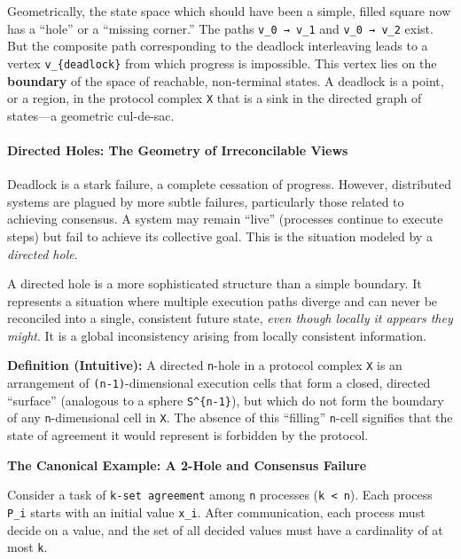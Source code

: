 \documentclass[
]{article}
\begin{document}
Geometrically, the state space which should have been a simple, filled
square now has a ``hole'' or a ``missing corner.'' The paths
\texttt{v\_0\ →\ v\_1} and \texttt{v\_0\ →\ v\_2} exist. But the
composite path corresponding to the deadlock interleaving leads to a
vertex \texttt{v\_\{deadlock\}} from which progress is impossible. This
vertex lies on the \textbf{boundary} of the space of reachable,
non-terminal states. A deadlock is a point, or a region, in the protocol
complex \texttt{X} that is a sink in the directed graph of states---a
geometric cul-de-sac.

\paragraph{Directed Holes: The Geometry of Irreconcilable
Views}\label{directed-holes-the-geometry-of-irreconcilable-views}

Deadlock is a stark failure, a complete cessation of progress. However,
distributed systems are plagued by more subtle failures, particularly
those related to achieving consensus. A system may remain ``live''
(processes continue to execute steps) but fail to achieve its collective
goal. This is the situation modeled by a \emph{directed hole}.

A directed hole is a more sophisticated structure than a simple
boundary. It represents a situation where multiple execution paths
diverge and can never be reconciled into a single, consistent future
state, \emph{even though locally it appears they might}. It is a global
inconsistency arising from locally consistent information.

\textbf{Definition (Intuitive):} A directed \texttt{n}-hole in a
protocol complex \texttt{X} is an arrangement of
\texttt{(n-1)}-dimensional execution cells that form a closed, directed
``surface'' (analogous to a sphere \texttt{S\^{}\{n-1\}}), but which do
not form the boundary of any \texttt{n}-dimensional cell in \texttt{X}.
The absence of this ``filling'' \texttt{n}-cell signifies that the state
of agreement it would represent is forbidden by the protocol.

\textbf{The Canonical Example: A 2-Hole and Consensus Failure}

Consider a task of \texttt{k-set\ agreement} among \texttt{n} processes
(\texttt{k\ \textless{}\ n}). Each process \texttt{P\_i} starts with an
initial value \texttt{x\_i}. After communication, each process must
decide on a value, and the set of all decided values must have a
cardinality of at most \texttt{k}.
\end{document}
